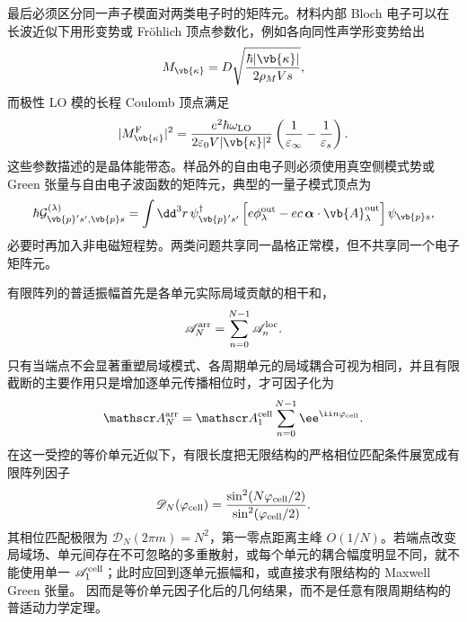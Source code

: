 最后必须区分同一声子模面对两类电子时的矩阵元。材料内部 Bloch 电子可以在长波近似下用形变势或 Fr\"ohlich 顶点参数化，例如各向同性声学形变势给出
\begin{equation*}
M_{\vb{\kappa}}=D\sqrt{\frac{\hbar|\vb{\kappa}|}{2\rho_MVs}},
\end{equation*}
而极性 LO 模的长程 Coulomb 顶点满足
\begin{equation*}
|M_{\vb{\kappa}}^{\rm F}|^2
=\frac{e^2\hbar\omega_{\rm LO}}{2\varepsilon_0V|\vb{\kappa}|^2}
\left(\frac1{\varepsilon_\infty}-\frac1{\varepsilon_s}\right).
\end{equation*}
这些参数描述的是晶体能带态。样品外的自由电子则必须使用真空侧模式势或 Green 张量与自由电子波函数的矩阵元，典型的一量子模式顶点为
\begin{equation*}
\hbar\mathcal G_{\vb{p}'s',\vb{p}s}^{(\lambda)}
=\int \dd^3 r\,\psi_{\vb{p}'s'}^\dagger
\left[e\phi_\lambda^{\rm out}-ec\,\boldsymbol\alpha\cdot\vb{A}_\lambda^{\rm out}\right]
\psi_{\vb{p}s},
\end{equation*}
必要时再加入非电磁短程势。两类问题共享同一晶格正常模，但不共享同一个电子矩阵元。

有限阵列的普适振幅首先是各单元实际局域贡献的相干和，
\begin{equation*}
\mathscr A_N^{\rm arr}
=\sum_{n=0}^{N-1}\mathscr A_n^{\rm loc}.
\end{equation*}
只有当端点不会显著重塑局域模式、各周期单元的局域耦合可视为相同，并且有限截断的主要作用只是增加逐单元传播相位时，才可因子化为
\begin{equation}
{
\mathscr A_N^{\rm arr}
=\mathscr A_1^{\rm cell}\sum_{n=0}^{N-1}\ee^{\ii n\varphi_{\rm cell}}.}
\label{eq:finite-periodic-array-amplitude-dp68}
\end{equation}
在这一受控的等价单元近似下，有限长度把无限结构的严格相位匹配条件展宽成有限阵列因子
\begin{equation}
{
\mathscr D_N(\varphi_{\rm cell})
=\frac{\sin^2(N\varphi_{\rm cell}/2)}
{\sin^2(\varphi_{\rm cell}/2)}.}
\label{eq:finite-periodic-array-factor-dp68}
\end{equation}
其相位匹配极限为 $\mathscr D_N(2\pi m)=N^2$，第一零点距离主峰 $O(1/N)$。若端点改变局域场、单元间存在不可忽略的多重散射，或每个单元的耦合幅度明显不同，就不能使用单一 $\mathscr A_1^{\rm cell}$；此时应回到逐单元振幅和，或直接求有限结构的 Maxwell Green 张量。 因而是等价单元因子化后的几何结果，而不是任意有限周期结构的普适动力学定理。



